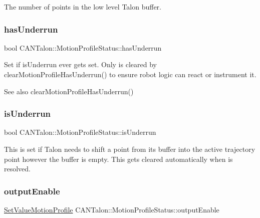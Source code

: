 The number of points in the low level Talon buffer. \mbox{\label{struct_c_a_n_talon_1_1_motion_profile_status_a5ec97fa0ef5505369b81103069fc2784}} 
\subsubsection{\texorpdfstring{has\+Underrun}{hasUnderrun}}
{\footnotesize\ttfamily bool C\+A\+N\+Talon\+::\+Motion\+Profile\+Status\+::has\+Underrun}

Set if is\+Underrun ever gets set. Only is cleared by clear\+Motion\+Profile\+Has\+Underrun() to ensure robot logic can react or instrument it. \begin{DoxySeeAlso}{See also}
clear\+Motion\+Profile\+Has\+Underrun() 
\end{DoxySeeAlso}
\mbox{\label{struct_c_a_n_talon_1_1_motion_profile_status_a2c55098ce3a4f09150ce4434e799d642}} 
\subsubsection{\texorpdfstring{is\+Underrun}{isUnderrun}}
{\footnotesize\ttfamily bool C\+A\+N\+Talon\+::\+Motion\+Profile\+Status\+::is\+Underrun}

This is set if Talon needs to shift a point from its buffer into the active trajectory point however the buffer is empty. This gets cleared automatically when is resolved. \mbox{\label{struct_c_a_n_talon_1_1_motion_profile_status_a561e0e418de46f7ef324496d5e8dc6fc}} 
\subsubsection{\texorpdfstring{output\+Enable}{outputEnable}}
{\footnotesize\ttfamily \hyperlink{class_c_a_n_talon_a3a5aa35beed1f5d9145dbd658b119b90}{Set\+Value\+Motion\+Profile} C\+A\+N\+Talon\+::\+Motion\+Profile\+Status\+::output\+Enable}

